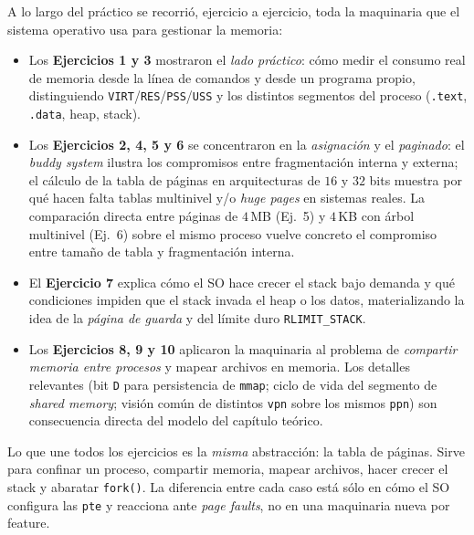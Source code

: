 \documentclass[11pt,a4paper]{article}
\begin{document}
A lo largo del práctico se recorrió, ejercicio a ejercicio, toda la
maquinaria que el sistema operativo usa para gestionar la memoria:

\begin{itemize}[leftmargin=*]
    \item Los \textbf{Ejercicios 1 y 3} mostraron el \emph{lado
        práctico}: cómo medir el consumo real de memoria desde la
        línea de comandos y desde un programa propio, distinguiendo
        \texttt{VIRT}/\texttt{RES}/\texttt{PSS}/\texttt{USS} y los
        distintos segmentos del proceso (\texttt{.text},
        \texttt{.data}, heap, stack).
    \item Los \textbf{Ejercicios 2, 4, 5 y 6} se concentraron en la
        \emph{asignación} y el \emph{paginado}: el \emph{buddy
        system} ilustra los compromisos entre fragmentación interna y
        externa; el cálculo de la tabla de páginas en arquitecturas de
        $16$ y $32$ bits muestra por qué hacen falta tablas multinivel
        y/o \emph{huge pages} en sistemas reales. La comparación
        directa entre páginas de $4$\,MB (Ej.\ 5) y $4$\,KB con árbol
        multinivel (Ej.\ 6) sobre el mismo proceso vuelve concreto el
        compromiso entre tamaño de tabla y fragmentación interna.
    \item El \textbf{Ejercicio 7} explica cómo el SO hace crecer el
        stack bajo demanda y qué condiciones impiden que el stack
        invada el heap o los datos, materializando la idea de la
        \emph{página de guarda} y del límite duro \texttt{RLIMIT\_STACK}.
    \item Los \textbf{Ejercicios 8, 9 y 10} aplicaron la maquinaria al
        problema de \emph{compartir memoria entre procesos} y mapear
        archivos en memoria. Los detalles relevantes (bit \texttt{D}
        para persistencia de \texttt{mmap}; ciclo de vida del
        segmento de \emph{shared memory}; visión común de distintos
        \texttt{vpn} sobre los mismos \texttt{ppn}) son consecuencia
        directa del modelo del capítulo teórico.
\end{itemize}

\begin{idea}
Lo que une todos los ejercicios es la \emph{misma} abstracción: la
tabla de páginas. Sirve para confinar un proceso, compartir memoria,
mapear archivos, hacer crecer el stack y abaratar \texttt{fork()}. La
diferencia entre cada caso está sólo en cómo el SO configura las
\texttt{pte} y reacciona ante \emph{page faults}, no en una
maquinaria nueva por feature.
\end{idea}
\end{document}
